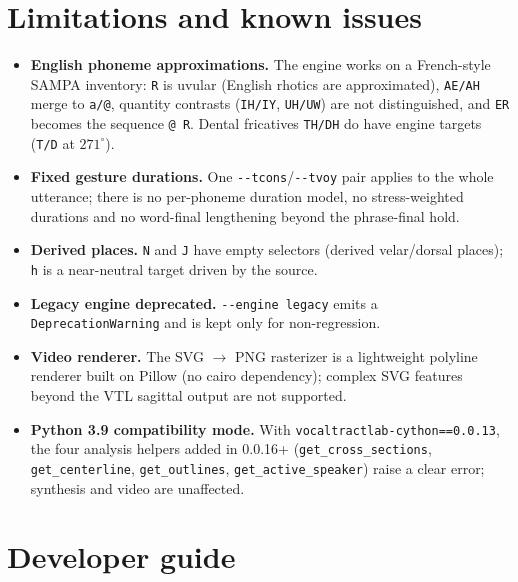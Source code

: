 \documentclass[11pt,a4paper]{article}
\begin{document}
\section{Limitations and known issues}\label{sec:limitations}

\begin{itemize}[leftmargin=1.5em]
\item \textbf{English phoneme approximations.} The engine works on a
      French-style SAMPA inventory: \texttt{R} is uvular (English rhotics
      are approximated), \texttt{AE/AH} merge to \texttt{a/@}, quantity
      contrasts (\texttt{IH/IY}, \texttt{UH/UW}) are not distinguished,
      and \texttt{ER} becomes the sequence \texttt{@ R}. Dental
      fricatives \texttt{TH/DH} do have engine targets (\texttt{T/D} at
      \(271^\circ\)).
\item \textbf{Fixed gesture durations.} One \texttt{-{}-tcons}/\texttt{-{}-tvoy}
      pair applies to the whole utterance; there is no per-phoneme
      duration model, no stress-weighted durations and no word-final
      lengthening beyond the phrase-final hold.
\item \textbf{Derived places.} \texttt{N} and \texttt{J} have empty
      selectors (derived velar/dorsal places); \texttt{h} is a
      near-neutral target driven by the source.
\item \textbf{Legacy engine deprecated.} \texttt{-{}-engine legacy} emits
      a \texttt{DeprecationWarning} and is kept only for non-regression.
\item \textbf{Video renderer.} The SVG \(\to\) PNG rasterizer is a
      lightweight polyline renderer built on Pillow (no cairo
      dependency); complex SVG features beyond the VTL sagittal output
      are not supported.
\item \textbf{Python 3.9 compatibility mode.} With
      \texttt{vocaltractlab-cython==0.0.13}, the four analysis helpers
      added in 0.0.16+ (\texttt{get\_cross\_sections},
      \texttt{get\_centerline}, \texttt{get\_outlines},
      \texttt{get\_active\_speaker}) raise a clear error; synthesis and
      video are unaffected.
\end{itemize}

\section{Developer guide}\label{sec:dev}
\end{document}
